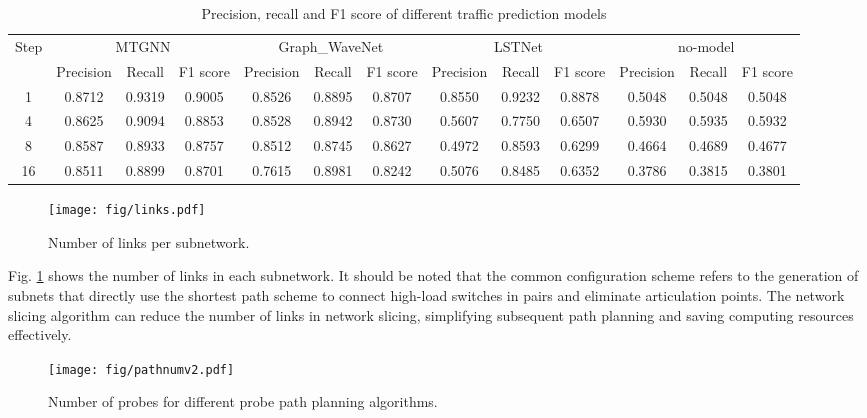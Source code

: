 \documentclass[journal]{IEEEtran}
\begin{document}
\begin{table*}  
\centering 
\caption{Precision, recall and F1 score of different traffic prediction models} 
\label{tab3} 
\begin{tabular}{c|ccc|ccc|ccc|ccc}   
\hline   
\multirow{2}{*}{Step} & \multicolumn{3}{c|}{MTGNN} & \multicolumn{3}{c|}{Graph\_WaveNet} & \multicolumn{3}{c|}{LSTNet}& \multicolumn{3}{c}{no-model} \\   
\cline{2-13} %
 & Precision & Recall & F1 score & Precision & Recall & F1 score & Precision & Recall & F1 score & Precision & Recall & F1 score \\   
\hline  

1 & 0.8712 & 0.9319 & 0.9005 & 0.8526 & 0.8895 & 0.8707 & 0.8550 & 0.9232 & 0.8878 & 0.5048 & 0.5048 & 0.5048\\  
4 & 0.8625 & 0.9094 & 0.8853 & 0.8528 & 0.8942 & 0.8730 & 0.5607 & 0.7750 & 0.6507 & 0.5930 & 0.5935 & 0.5932\\  
8 & 0.8587 & 0.8933 & 0.8757 & 0.8512 & 0.8745 & 0.8627 & 0.4972 & 0.8593 & 0.6299 & 0.4664 & 0.4689 & 0.4677\\  
16 & 0.8511 & 0.8899 & 0.8701 & 0.7615 & 0.8981 & 0.8242 & 0.5076 & 0.8485 & 0.6352 & 0.3786 & 0.3815 & 0.3801\\  
\hline  
\end{tabular}  
\end{table*}  





\begin{figure}
\centering
\setlength{\abovecaptionskip}{0.cm}

\texttt{[image: fig/links.pdf]}
\caption{Number of links per subnetwork. }
\label{fig15}
\vspace{-0.1cm}
\end{figure}

Fig. \ref{fig15} shows the number of links in each subnetwork. It should be noted that the common configuration scheme refers to the generation of subnets that directly use the shortest path scheme to connect high-load switches in pairs and eliminate articulation points. The network slicing algorithm can reduce the number of links in network slicing, simplifying subsequent path planning and saving computing resources effectively.

\begin{figure}
\centering
\setlength{\abovecaptionskip}{0.cm}

\texttt{[image: fig/pathnumv2.pdf]}
\caption{Number of probes for different probe path planning algorithms. }
\label{fig16}
\vspace{-0.1cm}
\end{figure}
\end{document}
